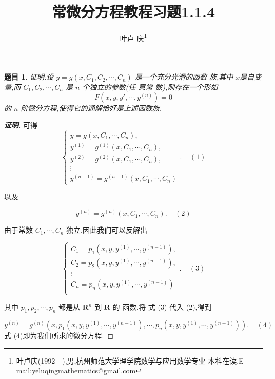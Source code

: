 \documentclass[a4paper]{article}
\newtheorem*{exe}{题目}
\newenvironment{exercise}
{\bigskip\begin{mdframed}\begin{exe}}
    {\end{exe}\end{mdframed}\bigskip}
\begin{document}
\title{\huge{\bf{常微分方程教程习题1.1.4}}} \author{\small{叶卢
    庆\footnote{叶卢庆(1992---),男,杭州师范大学理学院数学与应用数学专业
      本科在读,E-mail:yeluqingmathematics@gmail.com}}}
\maketitle
\begin{exercise}
  证明:设 $ y=g(x,C_1,C_2,\cdots,C_n)$ 是一个充分光滑的函数 族,其中 $
  x$是自变量,而 $ C_1,C_2,\cdots,C_n$ 是 $ n$ 个独立的参数(任 意常
  数),则存在一个形如
$$F(x,y,y',\cdots,y^{(n)})=0$$
的 $ n$ 阶微分方程,使得它的通解恰好是上述函数族.
\end{exercise}
\begin{proof}[\textbf{证明}]
  可得
  $$ {\displaystyle \begin{cases} y=g(x,C_1,\cdots,C_n),\\
      y^{(1)}=g^{(1)}(x,C_1,\cdots,C_n),\\
      y^{(2)}=g^{(2)}(x,C_1,\cdots,C_n),\\ \vdots\\
      y^{(n-1)}=g^{(n-1)}(x,C_1,\cdots,C_n) \end{cases}. \ \ \ \ \
    (1)}$$

  以及

  $$ {\displaystyle y^{(n)}=g^{(n)}(x,C_1,\cdots,C_n). \ \ \ \ \ (2)}$$

  由于常数 $ C_1,\cdots,C_n$ 独立,因此我们可以反解出

  $$ {\displaystyle \begin{cases}
      C_1=p_1(x,y,y^{(1)},\cdots,y^{(n-1)}),\\
      C_2=p_2(x,y,y^{(1)},\cdots,y^{(n-1)}),\\ \vdots\\
      C_n=p_n(x,y,y^{(1)},\cdots,y^{(n-1)})\\ \end{cases}. \ \ \ \ \
    (3)}$$

  其中 $ p_1,p_2,\cdots,p_n$ 都是从 $ \mathbf{R}^n$ 到 $ \mathbf{R}$ 的
  函数.将 式 (3) 代入 (2),得到

  $$ {\displaystyle
    y^{(n)}=g^{(n)}(x,p_1(x,y,y^{(1)},\cdots,y^{(n-1)}),\cdots,p_n(x,y,y^{(1)},\cdots,y^{(n-1)})). \
    \ \ \ \ (4)}$$式 (4)即为我们所求的微分方程.
\end{proof}
\end{document}
